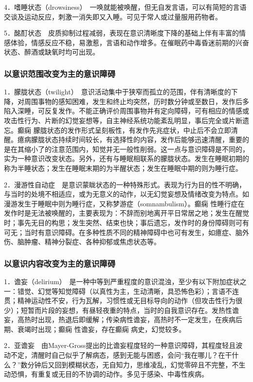 4．嗜睡状态（drowsiness）　一唤就能被唤醒，但无自发言语，可以有简短的言语交谈及运动反应，刺激一消失即又入睡。可见于常人或过量服用药物者。

5．酩酊状态　皮质抑制过程减弱，表现在意识清晰度下降的基础上伴有丰富的情感体验，情感反应不稳，易激惹，言语和动作增多。在催眠药中毒昏迷前期的兴奋状态、醉酒或缺氧时均可出现。

\subsubsection{以意识范围改变为主的意识障碍}

1．朦胧状态（twilight）　意识活动集中于狭窄而孤立的范围，伴有清晰度的下降，对周围事物的感知困难，发生和终止均突然，历时数分钟或至数日，发作后多陷入深睡，可反复发作。不能正确评价周围事物并有定向障碍，可有相应的情感或攻击性行为、片断的幻觉妄想等，自主神经系统功能紊乱明显，事后完全或片断遗忘。癫痫
朦胧状态的发作形式呈刻板性，有发作先兆症状，中止后不会立即清醒。癔病朦胧状态持续时间较长，有选择性的内容，发作后能够迅速清醒，重要的是在其缩小了的注意范围内，知觉并无一般性削弱。这一点与意识障碍是不同的，实为一种意识改变状态。另外，还有与睡眠相联系的朦胧状态。发生在睡眠初期的称为半睡状态；发生在睡眠末期的为半醒状态；发生在睡眠中期的则为睡行症。

2．漫游性自动症　是意识蒙眬状态的一种特殊形式。表现为行为目的性不明确，与当时的处境不相适应，或为无意义的动作，以无幻觉妄想及情绪改变为特点。如漫游发生于睡眠中则为睡行症，又称梦游症（somnambulism）。癫痫
性睡行症在发作时是无法被唤醒的，主要表现为：不辞而别地离开平日常居之地；发生在醒觉时；事先无目的构思；发生突然、结束也快；事后遗忘，发作时的身份障碍则可有可无；当时有意识障碍。在多种性质不同的精神障碍中也可有发生，如癔症、脑外伤、脑肿瘤、精神分裂症、各种抑郁或焦虑状态等。

\subsubsection{以意识内容改变为主的意识障碍}

1．谵妄（delirium）　是一种中等到严重程度的意识混浊，至少有以下附加症状之一：错觉、幻觉等知觉障碍（以真性为主，生动清晰，具恐怖色彩）；言语不连贯；精神运动性不安，行为瓦解，习惯性或无目标导向的动作（但攻击性行为很少）；短暂而片段的妄想，有昼轻夜重的特点，当时的自我意识存在。发热性谵妄，高热时出现，热退后即缓解；传染病性谵妄，高热时不一定发生，在疾病后期、衰竭时出现；癫痫
性谵妄，存在癫痫 病史，幻觉较多。

2．亚谵妄　由Mayer-Gross提出的比谵妄程度轻的一种意识障碍，其程度轻且波动不定，清醒时自己似乎了解病态，感到无能与困惑，会问``我在哪儿？在干什么？''数分钟后又回到模糊状态，无自知力，思维凌乱，幻觉零碎且不完整，不生动恐惧，有重复或无目的不协调的动作。多见于感染、中毒性疾病。

